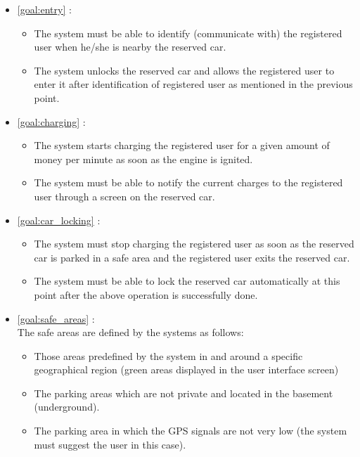 \begin{itemize}
	\item \ref{goal:entry} :
	\begin{itemize}
		\item The system must be able to identify (communicate with) the registered user when he/she is nearby the reserved car.
		\item The system unlocks the reserved car and allows the registered user to enter it after identification of registered user as mentioned in the previous point.
	\end{itemize}

	\item \ref{goal:charging} :
	\begin{itemize}
		\item The system starts charging the registered user for a given amount of money per minute as soon as the engine is ignited.
		\item The system must be able to notify the current charges to the registered user through a screen on the reserved car.
	\end{itemize}

	\item \ref{goal:car_locking} :
	\begin{itemize}
		\item The system must stop charging the registered user as soon as the reserved car is parked in a safe area and the registered user exits the reserved car.
		\item The system must be able to lock the reserved car automatically at this point after the above operation is successfully done.
	\end{itemize}

	\item \ref{goal:safe_areas} : \\ The safe areas are defined by the systems as follows:
	\begin{itemize}
		\item Those areas predefined by the system in and around a specific geographical region (green areas displayed in the user interface screen)
		\item The parking areas which are not private and located in the basement (underground).
		\item The parking area in which the GPS signals are not very low (the system must suggest the user in this case).
	\end{itemize}
\end{itemize}

